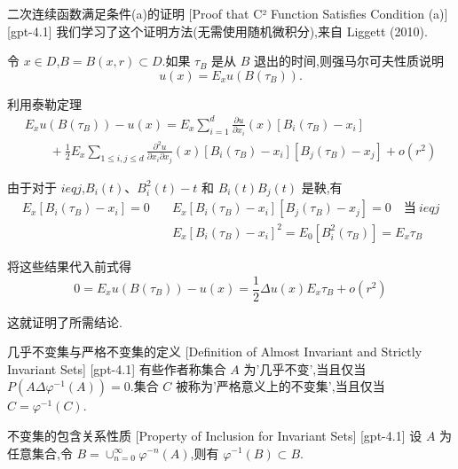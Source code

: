\documentclass[UTF8]{ctexart}
\begin{document}
    \begin{prf}
        {二次连续函数满足条件(a)的证明}
        [Proof that C² Function Satisfies Condition (a)]
        [gpt-4.1]
        我们学习了这个证明方法(无需使用随机微积分),来自 Liggett (2010).

令 $x \in D$,$B = B(x, r) \subset D$.如果 $\tau_{B}$ 是从 $B$ 退出的时间,则强马尔可夫性质说明
\[
u(x) = E_{x} 
u(B(\tau_{B})).
\]

利用泰勒定理
\[
\begin{array}{l}
{\displaystyle
E_{x} 
u(B(\tau_{B})) - 
u(x) = E_{x} \sum_{i=1}^{d} \frac{\partial 
u}{\partial x_{i}}(x) [ B_{i}(\tau_{B}) - x_{i} ]
}
\\
{\displaystyle
\qquad + \frac{1}{2} E_{x} \sum_{1 \leq i, j \leq d} \frac{\partial^{2} 
u}{\partial x_{i} \partial x_{j}}(x) [ B_{i}(\tau_{B}) - x_{i} ][ B_{j}(\tau_{B}) - x_{j} ] + o(r^{2})
}
\end{array}
\]

由于对于 $i 
eq j$,$B_{i}(t)$、$B_{i}^{2}(t) - t$ 和 $B_{i}(t) B_{j}(t)$ 是鞅,有
\[
\begin{array}{rl}
E_{x} [ B_{i}(\tau_{B}) - x_{i} ] = 0 \quad &
E_{x} [ B_{i}(\tau_{B}) - x_{i} ][ B_{j}(\tau_{B}) - x_{j} ] = 0 \quad \mathrm{当~} i 
eq j \\
& E_{x} [ B_{i}(\tau_{B}) - x_{i} ]^{2} = E_{0} [ B_{i}^{2}(\tau_{B}) ] = E_{x} \tau_{B}
\end{array}
\]

将这些结果代入前式得
\[
0 = E_{x} 
u(B(\tau_{B})) - 
u(x) = \frac{1}{2} \Delta 
u(x) E_{x} \tau_{B} + o(r^{2})
\]

这就证明了所需结论.
    \end{prf}
    
    
    
    \begin{dfn}
        {几乎不变集与严格不变集的定义}
        [Definition of Almost Invariant and Strictly Invariant Sets]
        [gpt-4.1]
        有些作者称集合 $A$ 为'几乎不变',当且仅当 $P(A \Delta \varphi^{-1}(A)) = 0$.集合 $C$ 被称为'严格意义上的不变集',当且仅当 $C = \varphi^{-1}(C)$.
    \end{dfn}
    
    
    
    \begin{ppt}
        {不变集的包含关系性质}
        [Property of Inclusion for Invariant Sets]
        [gpt-4.1]
        设 $A$ 为任意集合,令 $B = \cup_{n=0}^{\infty} \varphi^{-n}(A)$,则有 $\varphi^{-1}(B) \subset B$.
    \end{ppt}
    
\end{document}
